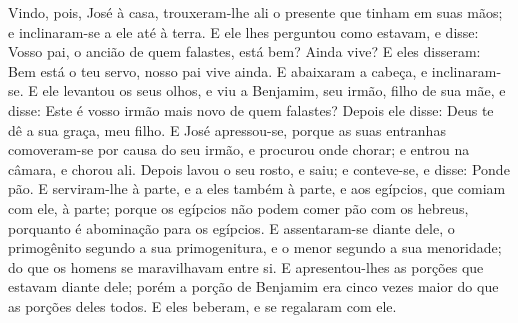 Vindo, pois, José à casa, trouxeram-lhe ali o presente que tinham
em suas mãos; e in\-cli\-na\-ram-se a ele até à terra. E ele lhes
perguntou como estavam, e disse: Vosso pai, o ancião de quem
falastes, está bem? Ainda vive? E eles disseram: Bem está o
teu servo, nosso pai vive ainda. E abaixaram a cabeça, e
inclinaram-se. E ele levantou os seus olhos, e viu a
Benjamim, seu irmão, filho de sua mãe, e disse: Este é vosso irmão
mais novo de quem falastes? Depois ele disse: Deus te dê a sua
graça, meu filho. E José apressou-se, porque as suas
entranhas comoveram-se por causa do seu irmão, e procurou onde
chorar; e entrou na câmara, e chorou ali. Depois lavou o seu
rosto, e saiu; e conteve-se, e disse: Ponde pão. E
serviram-lhe à parte, e a eles também à parte, e aos egípcios, que
comiam com ele, à parte; porque os egípcios não podem comer pão com
os hebreus, porquanto é abominação para os egípcios. E
assentaram-se diante dele, o primogênito segundo a sua
primogenitura, e o menor segundo a sua menoridade; do que os homens
se maravilhavam entre si. E apresentou-lhes as porções que
estavam diante dele; porém a porção de Benjamim era cinco vezes
maior do que as porções deles todos. E eles beberam, e se regalaram
com ele.

\smallskip

